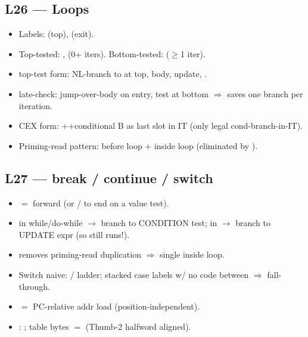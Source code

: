\subsection{L26 --- Loops}
\begin{itemize}
\item Labels:  (top),  (exit).
\item Top-tested: ,  (0+ iters). Bottom-tested:  ($\ge$1 iter).
\item {} top-test form: NL-branch to  at top, body, update, .
\item {} late-check: jump-over-body on entry, test at bottom $\Rightarrow$ saves one branch per iteration.
\item {} CEX form: ++conditional B as last slot in IT (only legal cond-branch-in-IT).
\item Priming-read pattern:  before loop +  inside loop (eliminated by ).
\end{itemize}

\subsection{L27 --- break / continue / switch}
\begin{itemize}
\item {} $=$ forward  (or / to end on a value test).
\item {} in while/do-while $\to$ branch to CONDITION test; in  $\to$ branch to UPDATE expr (so  still runs!).
\item {} removes priming-read duplication $\Rightarrow$ single  inside loop.
\item Switch naive: / ladder; stacked case labels w/ no code between $\Rightarrow$ fall-through.
\item {} $=$ PC-relative addr load (position-independent).
\item {}: ; table bytes $=$  (Thumb-2 halfword aligned).
\end{itemize}
